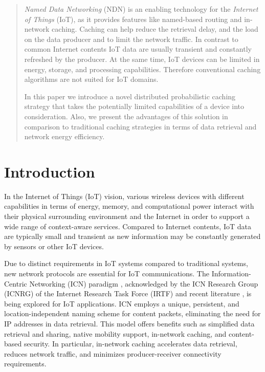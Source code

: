 \documentclass[conference]{IEEEtran}
\begin{document}
\begin{abstract}
\textit{Named Data Networking} (NDN) is an enabling technology for the \textit{Internet of Things} (IoT),
as it provides features like named-based routing and in-network caching. Caching can help reduce
the retrieval delay, and the load on the data producer and to limit the network traffic. In contrast to common Internet
contents IoT data are usually transient and constantly refreshed by the producer. At the same time, IoT devices can
be limited in energy, storage, and processing capabilities. Therefore conventional caching algorithms are not
suited for IoT domains.

In this paper we introduce a novel distributed probabilistic caching strategy that takes the potentially limited
capabilities of a device into consideration. Also, we present the advantages of this solution in comparison to traditional 
caching strategies in terms of data retrieval and network energy efficiency.
\end{abstract}


\section{Introduction}
In the Internet of Things (IoT) vision, various wireless devices with different capabilities in terms of
energy, memory, and computational power interact with their physical surrounding environment and the Internet
in order to support a wide range of context-aware services. Compared to Internet contents, IoT data are typically
small and transient as new information may be constantly generated by sensors or other IoT devices.

Due to distinct requirements in IoT systems compared to traditional systems, new network protocols are essential 
for IoT communications. The Information-Centric Networking (ICN) paradigm \cite{b2}, acknowledged by the ICN Research 
Group (ICNRG) of the Internet Research Task Force (IRTF) \cite{b3} and recent literature \cite{b4}, is being explored 
for IoT applications. ICN employs a unique, persistent, and location-independent naming scheme for content packets, 
eliminating the need for IP addresses in data retrieval. This model offers benefits such as simplified data retrieval 
and sharing, native mobility support, in-network caching, and content-based security. In particular, in-network caching 
accelerates data retrieval, reduces network traffic, and minimizes producer-receiver connectivity requirements.
\end{document}

